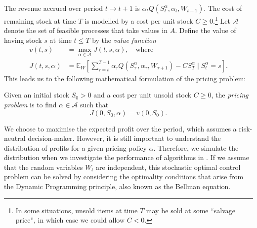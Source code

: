 \documentclass[main.tex]{subfiles}
\begin{document}
The revenue accrued over period $t\to t+1$ is $\alpha_tQ(S_t^\alpha,\alpha_t,W_{t+1})$.
The cost of remaining stock at time $T$ is modelled by a cost per unit
stock $C\geq 0$.\footnote{In some situations, unsold items at time $T$
  may be sold at some ``salvage price'', in which case we could allow
  $C<0$.}
Let $\mathcal A$ denote the set of feasible processes that take values
in $A$.
Define the value of having stock $s$ at time $t\leq T$
by the \emph{value function}
\begin{align}\label{eq:value_function_def}
  v(t,s)&=\max_{\alpha\in\mathcal A} J(t,s,\alpha),\quad\text{where}\\
  J(t,s,\alpha)&=
                 \mathbb E_{W}\left[ \sum_{\tau=t}^{T-1}
                 \alpha_\tau Q(S_\tau^\alpha,\alpha_\tau,W_{\tau+1})
                 - CS_T^\alpha \mid S_t^\alpha = s
                 \right].
                 \label{eq:value_function_def2}
\end{align}
This leads us to the following mathematical formulation of the pricing
problem:
\begin{mydef}
  Given an initial stock $S_0>0$ and a cost per unit unsold stock $C\geq
  0$, the \emph{pricing problem} is to find $\alpha\in\mathcal A$ such that
  \begin{equation}
    J(0,S_0,\alpha) = v(0,S_0).
  \end{equation}
\end{mydef}
We choose to maximise the expected profit over the period, which
assumes a risk-neutral decision-maker. However, it is still important
to understand the distribution of profits for a given pricing policy
$\alpha$. Therefore, we simulate the distribution when
we investigate the performance of algorithms in
.%
If we assume that the random variables $W_t$ are independent, this
stochastic optimal control problem can be solved by
considering the optimality conditions that arise from the Dynamic
Programming principle, also known as the Bellman equation.
\end{document}
